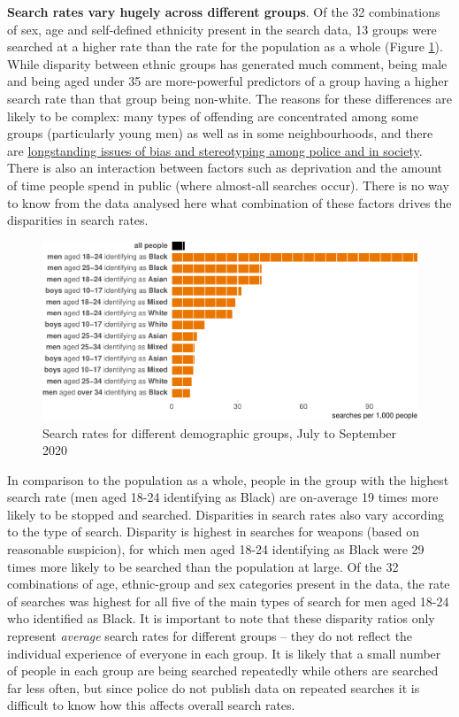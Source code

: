 \documentclass[
  a4paper,
  twoside, 11pt]{article}
\begin{document}
\textbf{Search rates vary hugely across different groups}. Of the 32 combinations of sex, age and self-defined ethnicity present in the search data, 13 groups were searched at a higher rate than the rate for the population as a whole (Figure \ref{fig:chart-disparity}). While disparity between ethnic groups has generated much comment, being male and being aged under 35 are more-powerful predictors of a group having a higher search rate than that group being non-white. The reasons for these differences are likely to be complex: many types of offending are concentrated among some groups (particularly young men) as well as in some neighbourhoods, and there are \href{https://www.bbc.co.uk/news/uk-47300343}{longstanding issues of bias and stereotyping among police and in society}. There is also an interaction between factors such as deprivation and the amount of time people spend in public (where almost-all searches occur). There is no way to know from the data analysed here what combination of these factors drives the disparities in search rates.



\begin{figure}[tb]

{\centering \includegraphics{2020-Q3_files/figure-latex/chart-disparity-1} 

}

\caption{Search rates for different demographic groups, July to September 2020}\label{fig:chart-disparity}
\end{figure}

In comparison to the population as a whole, people in the group with the highest search rate (men aged 18-24 identifying as Black) are on-average 19 times more likely to be stopped and searched. Disparities in search rates also vary according to the type of search. Disparity is highest in searches for weapons (based on reasonable suspicion), for which men aged 18-24 identifying as Black were 29 times more likely to be searched than the population at large. Of the 32 combinations of age, ethnic-group and sex categories present in the data, the rate of searches was highest for all five of the main types of search for men aged 18-24 who identified as Black. It is important to note that these disparity ratios only represent \emph{average} search rates for different groups -- they do not reflect the individual experience of everyone in each group. It is likely that a small number of people in each group are being searched repeatedly while others are searched far less often, but since police do not publish data on repeated searches it is difficult to know how this affects overall search rates.
\end{document}
